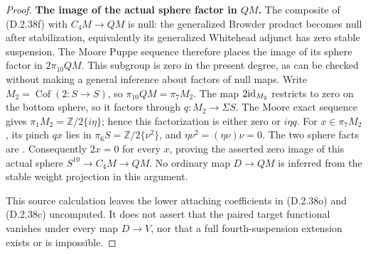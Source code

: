 \begin{proof}
\medskip\noindent
\textbf{The image of the actual sphere factor in $QM$.}
The composite of \textup{(D.2.38f)} with $C_4M\to QM$ is
null: the generalized Browder product becomes null after
stabilization, equivalently its generalized Whitehead adjunct
has zero stable suspension.  The Moore Puppe sequence therefore
places the image of its sphere factor in $2\pi_{10}QM$.
This subgroup is zero in the present degree, as can be checked
without making a general inference about factors of null maps.
Write $M_2=\operatorname{Cof}(2:S\to S)$, so
$\pi_{10}QM=\pi_7M_2$.
The map $2\mathrm{id}_{M_2}$ restricts to zero on the bottom sphere,
so it factors through $q:M_2\to\Sigma S$.
The Moore exact sequence gives
$\pi_1M_2=\mathbb Z/2\{i\eta\}$; hence this factorization
is either zero or $i\eta q$.
For $x\in\pi_7M_2$, its pinch $qx$ lies in
$\pi_6S=\mathbb Z/2\{\nu^2\}$, and
$\eta\nu^2=(\eta\nu)\nu=0$.
The two sphere facts are
\cite[equation~(2.1)(e'),(g), p.~149]{I_Oka1986}.
Consequently $2x=0$ for every $x$, proving the asserted zero
image of this actual sphere $S^{10}\to C_4M\to QM$.
No ordinary map $D\to QM$ is inferred from the stable weight
projection in this argument.

This source calculation leaves the lower attaching coefficients
in \textup{(D.2.38o)} and \textup{(D.2.38c)} uncomputed.
It does not assert that the paired target functional vanishes
under every map $D\to V$, nor that a full fourth-suspension
extension exists or is impossible.
\end{proof}
